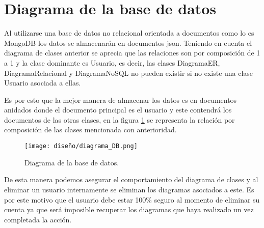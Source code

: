 \section{Diagrama de la base de datos}


Al utilizarse una base de datos no relacional orientada a documentos como lo es MongoDB los datos se almacenarán en documentos json. Teniendo en cuenta el diagrama de clases anterior se aprecia que las relaciones son por composición de 1 a 1 y la clase dominante es Usuario, es decir, las clases DiagramaER, DiagramaRelacional y DiagramaNoSQL no pueden existir si no existe una clase Usuario asociada a ellas.


Es por esto que la mejor manera de almacenar los datos es en documentos anidados donde el documento principal es el usuario y este contendrá los documentos de las otras clases, en la figura \ref{img:database_schema} se representa la relación por composición de las clases mencionada con anterioridad.


\begin{figure}[H]
    \centering
    \texttt{[image: diseño/diagrama\_DB.png]}
    \caption{Diagrama de la base de datos.}
    \label{img:database_schema}
\end{figure}


De esta manera podemos asegurar el comportamiento del diagrama de clases y al eliminar un usuario internamente se eliminan los diagramas asociados a este. Es por este motivo que el usuario debe estar 100\% seguro al momento de eliminar su cuenta ya que será imposible recuperar los diagramas que haya realizado un vez completada la acción.